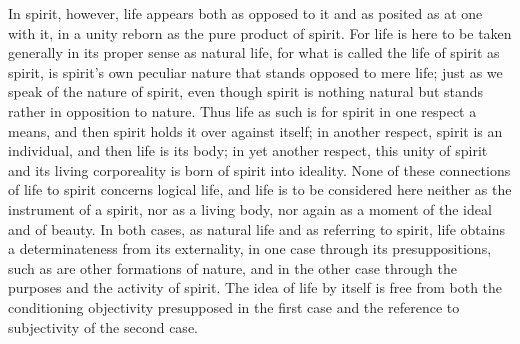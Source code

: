 In spirit, however, life appears both as opposed to it and as posited as at
one with it, in a unity reborn as the pure product of spirit. For life is here
to be taken generally in its proper sense as natural life, for what is called
the life of spirit as spirit, is spirit's own peculiar nature that stands opposed
to mere life; just as we speak of the nature of spirit, even though spirit is
nothing natural but stands rather in opposition to nature. Thus life as such
is for spirit in one respect a means, and then spirit holds it over against
itself; in another respect, spirit is an individual, and then life is its body; in
yet another respect, this unity of spirit and its living corporeality is born
of spirit into ideality. None of these connections of life to spirit concerns
logical life, and life is to be considered here neither as the instrument of
a spirit, nor as a living body, nor again as a moment of the ideal and of
beauty.
 In both cases, as natural life and as referring to spirit, life obtains a
determinateness from its externality, in one case through its presuppositions,
such as are other formations of nature, and in the other case through the
purposes and the activity of spirit. The idea of life by itself is free from both
the conditioning objectivity presupposed in the first case and the reference
to subjectivity of the second case.

